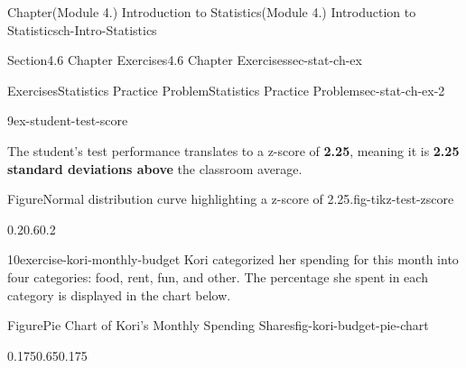 \documentclass[oneside,10pt,]{book}
\newcommand{\terminology}[1]{\textbf{#1}}
\begin{document}
\begin{chapterptx}{Chapter}{(Module 4.) Introduction to Statistics}{}{(Module 4.) Introduction to Statistics}{}{}{ch-Intro-Statistics}
\begin{sectionptx}{Section}{4.6 Chapter Exercises}{}{4.6 Chapter Exercises}{}{}{sec-stat-ch-ex}
\begin{exercises-subsection-numberless}{Exercises}{Statistics Practice Problem}{}{Statistics Practice Problem}{}{}{sec-stat-ch-ex-2}
\begin{divisionexercise}{9}{}{}{ex-student-test-score}
%
\par
The student's test performance translates to a z-score of \terminology{2.25}, meaning it is \terminology{2.25 standard deviations above} the classroom average.%
\begin{figureptx}{Figure}{Normal distribution curve highlighting a z-score of 2.25.}{fig-tikz-test-zscore}{}%
\begin{image}{0.2}{0.6}{0.2}{}%
%
\end{image}%
\tcblower
\end{figureptx}%
\end{divisionexercise}%
\begin{divisionexercise}{10}{}{}{exercise-kori-monthly-budget}%
Kori categorized her spending for this month into four categories: food, rent, fun, and other. The percentage she spent in each category is displayed in the chart below.%
\begin{figureptx}{Figure}{Pie Chart of Kori's Monthly Spending Shares}{fig-kori-budget-pie-chart}{}%
\begin{image}{0.175}{0.65}{0.175}{}%
\end{image}
\end{figureptx}
\end{divisionexercise}
\end{exercises-subsection-numberless}
\end{sectionptx}
\end{chapterptx}
\end{document}
